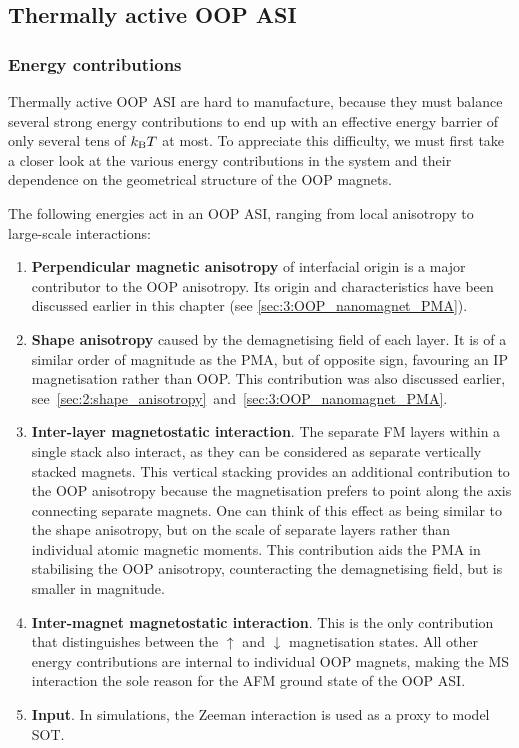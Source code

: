 \subsection{Thermally active OOP ASI}
\subsubsection{Energy contributions}
Thermally active OOP ASI are hard to manufacture, because they must balance several strong energy contributions to end up with an effective energy barrier of only several tens of $\kBT$ at most.
To appreciate this difficulty, we must first take a closer look at the various energy contributions in the system and their dependence on the geometrical structure of the OOP magnets. \par

The following energies act in an OOP ASI, ranging from local anisotropy to large-scale interactions:
\begin{enumerate}
	\item \textbf{Perpendicular magnetic anisotropy} of interfacial origin is a major contributor to the OOP anisotropy.
	Its origin and characteristics have been discussed earlier in this chapter (see \cref{sec:3:OOP_nanomagnet_PMA}). %
	\item \textbf{Shape anisotropy} caused by the demagnetising field of each layer.
	It is of a similar order of magnitude as the PMA, but of opposite sign, favouring an IP magnetisation rather than OOP.
	This contribution was also discussed earlier, see~\cref{sec:2:shape_anisotropy}~and~\ref{sec:3:OOP_nanomagnet_PMA}. %
	\item \textbf{Inter-layer magnetostatic interaction}.
	The separate FM layers within a single stack also interact, as they can be considered as separate vertically stacked magnets.
	This vertical stacking provides an additional contribution to the OOP anisotropy because the magnetisation prefers to point along the axis connecting separate magnets.
	One can think of this effect as being similar to the shape anisotropy, but on the scale of separate layers rather than individual atomic magnetic moments.
	This contribution aids the PMA in stabilising the OOP anisotropy, counteracting the demagnetising field, but is smaller in magnitude. %
	\item \textbf{Inter-magnet magnetostatic interaction}.
	This is the only contribution that distinguishes between the $\uparrow$ and $\downarrow$ magnetisation states.
	All other energy contributions are internal to individual OOP magnets, making the MS interaction the sole reason for the AFM ground state of the OOP ASI. %
	\item \textbf{Input}.
	In simulations, the Zeeman interaction is used as a proxy to model SOT. \\
\end{enumerate}

